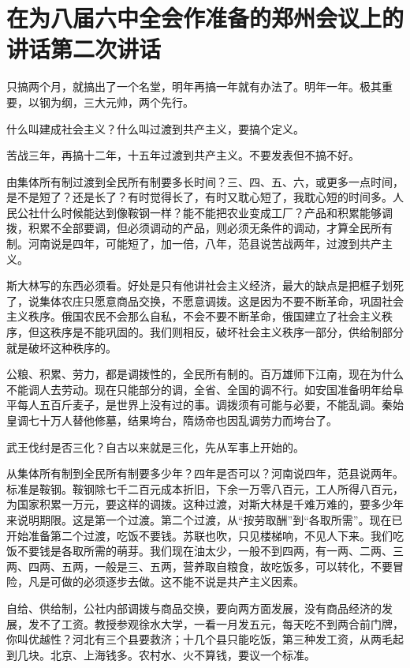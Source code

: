 \section[在为八届六中全会作准备的郑州会议上的讲话第二次讲话（一九五八年十一月六日）]{在为八届六中全会作准备的郑州会议上的讲话第二次讲话}


只搞两个月，就搞出了一个名堂，明年再搞一年就有办法了。明年一年。极其重要，以钢为纲，三大元帅，两个先行。

什么叫建成社会主义？什么叫过渡到共产主义，要搞个定义。

苦战三年，再搞十二年，十五年过渡到共产主义。不要发表但不搞不好。

由集体所有制过渡到全民所有制要多长时间？三、四、五、六，或更多一点时间，是不是短了？还是长了？有时觉得长了，有时又耽心短了，我耽心短的时间多。人民公社什么时候能达到像鞍钢一样？能不能把农业变成工厂？产品和积累能够调拨，积累不全部要调，但必须调动的产品，则必须无条件的调动，才算全民所有制。河南说是四年，可能短了，加一倍，八年，范县说苦战两年，过渡到共产主义。

斯大林写的东西必须看。好处是只有他讲社会主义经济，最大的缺点是把框子划死了，说集体农庄只愿意商品交换，不愿意调拨。这是因为不要不断革命，巩固社会主义秩序。俄国农民不会那么自私，不会不要不断革命，俄国建立了社会主义秩序，但这秩序是不能巩固的。我们则相反，破坏社会主义秩序一部分，供给制部分就是破坏这种秩序的。

公粮、积累、劳力，都是调拨性的，全民所有制的。百万雄师下江南，现在为什么不能调人去劳动。现在只能部分的调，全省、全国的调不行。如安国准备明年给阜平每人五百斤麦子，是世界上没有过的事。调拨须有可能与必要，不能乱调。秦始皇调七十万人替他修墓，结果垮台，隋炀帝也因乱调劳力而垮台了。

武王伐纣是否三化？自古以来就是三化，先从军事上开始的。

从集体所有制到全民所有制要多少年？四年是否可以？河南说四年，范县说两年。标准是鞍钢。鞍钢除七千二百元成本折旧，下余一万零八百元，工人所得八百元，为国家积累一万元，要这样的调拨。这种过渡，对斯大林是千难万难的，要多少年来说明期限。这是第一个过渡。第二个过渡，从“按劳取酬”到“各取所需”。现在已开始准备第二个过渡，吃饭不要钱。苏联也吹，只见楼梯响，不见人下来。我们吃饭不要钱是各取所需的萌芽。我们现在油太少，一般不到四两，有一两、二两、三两、四两、五两，一般是三、五两，营养取自粮食，故吃饭多，可以转化，不要冒险，凡是可做的必须逐步去做。这不能不说是共产主义因素。

自给、供给制，公社内部调拨与商品交换，要向两方面发展，没有商品经济的发展，发不了工资。教授参观徐水大学，一看一月发五元，每天吃不到两合前门牌，你叫优越性？河北有三个县要救济；十几个县只能吃饭，第三种发工资，从两毛起到几块。北京、上海钱多。农村水、火不算钱，要议一个标准。

